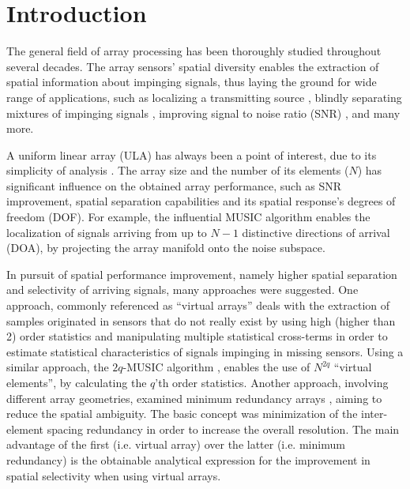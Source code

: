 \chapter{Introduction}
\label{chap:intro}
The general field of array processing has been thoroughly studied throughout several decades.
The array sensors' spatial diversity enables the extraction of spatial information about impinging signals, thus laying the ground for wide range of applications, such as localizing a transmitting source \cite{skolnik2008radar,long2019}, blindly separating mixtures of impinging signals \cite{comon1994independent}, improving signal to noise ratio (SNR) \cite{verdu1998multiuser}, and many more. 
\par A uniform linear array (ULA) has always been a point of interest, due to its simplicity of analysis \cite{van2004optimum,benesty2018}. 
The array size and the number of its elements ($N$) has significant influence on the obtained array performance, such as SNR improvement, spatial separation capabilities and its spatial response's degrees of freedom (DOF). For example, the influential MUSIC algorithm \cite{schmidt1986multiple} enables the localization of signals arriving from up to $N-1$ distinctive directions of arrival (DOA), by projecting the array manifold onto the noise subspace.
\par In pursuit of spatial performance improvement, namely higher spatial separation and selectivity of arriving signals, many approaches were suggested.  
One approach, commonly referenced as ``virtual arrays'' \cite{pal2010nested,chevalier2005virtual,dogan1995applications} deals with the extraction of samples originated in sensors that do not really exist by using high (higher than 2) order statistics and manipulating multiple statistical cross-terms in order to estimate statistical characteristics of signals impinging in missing sensors.
Using a similar approach, the $2q$-MUSIC algorithm \cite{chevalier2006high}, enables the use of $N^{2q}$ ``virtual elements'', by calculating the $q$'th order statistics.
Another approach, involving different array geometries, examined minimum redundancy arrays \cite{moffet1968minimum,pillai1985new,pillai1987statistical,Kupershtein2013}, aiming to reduce the spatial ambiguity. The basic concept was minimization of the inter-element spacing redundancy in order to increase the overall resolution.
The main advantage of the first (i.e. virtual array) over the latter (i.e. minimum redundancy) is the obtainable analytical expression for the improvement in spatial selectivity when using virtual arrays.
